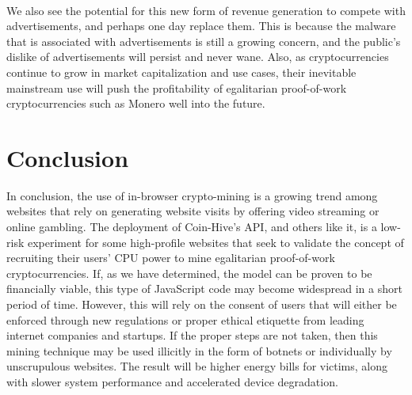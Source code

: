 \\
We also see the potential for this new form of revenue generation to compete with advertisements, and perhaps one day replace them. This is because the malware that is associated with advertisements is still a growing concern, and the public’s dislike of advertisements will persist and never wane. Also, as cryptocurrencies continue to grow in market capitalization and use cases, their inevitable mainstream use will push the profitability of egalitarian proof-of-work cryptocurrencies such as Monero well into the future.


\section{Conclusion}
In conclusion, the use of in-browser crypto-mining is a growing trend among websites that rely on generating website visits by offering video streaming or online gambling. The deployment of Coin-Hive’s API, and others like it, is a low-risk experiment for some high-profile websites that seek to validate the concept of recruiting their users’ CPU power to mine egalitarian proof-of-work cryptocurrencies. If, as we have determined, the model can be proven to be financially viable, this type of JavaScript code may become widespread in a short period of time. However, this will rely on the consent of users that will either be enforced through new regulations or proper ethical etiquette from leading internet companies and startups. If the proper steps are not taken, then this mining technique may be used illicitly in the form of botnets or individually by unscrupulous websites. The result will be higher energy bills for victims, along with slower system performance and accelerated device degradation.

